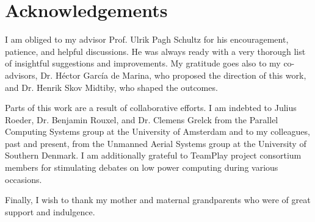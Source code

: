 
%
%
\chapter*{Acknowledgements}


I am obliged to my advisor Prof. Ulrik Pagh Schultz for his encouragement, patience, and helpful discussions. He was always ready with a very thorough list of insightful suggestions and improvements. My gratitude goes also to my co-advisors, Dr. H\'ector Garc\'ia de Marina, who proposed the direction of this work, and Dr. Henrik Skov Midtiby, who shaped the outcomes.

Parts of this work are a result of collaborative efforts. I am indebted to Julius Roeder, Dr. Benjamin Rouxel, and Dr. Clemens Grelck from the Parallel Computing Systems group at the University of Amsterdam and to my colleagues, past and present, from the Unmanned Aerial Systems group at the University of Southern Denmark. I am additionally grateful to TeamPlay project consortium members for stimulating debates on low power computing during various occasions.

Finally, I wish to thank my mother and maternal grandparents who were of great support and indulgence.

\cleardoublepage   %


